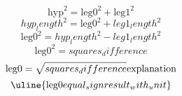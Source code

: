\[\text{{{hyp}}}^{{2}}=\text{{{leg0}}}^{{2}}+\text{{{leg1}}}^{{2}}\]
\[{hyp_length}^{{2}}=\text{{{leg0}}}^{{2}}+{leg1_length}^{{2}}\]
\[\text{{{leg0}}}^{{2}}={hyp_length}^{{2}}-{leg1_length}^{{2}}\]
\[\text{{{leg0}}}^{{2}}={squares_difference}\]
\[\text{{{leg0}}}=\sqrt{{\mathstrut {squares_difference}}}\text{{{explanation}}}\]
\[\uline{{\text{{{leg0}}}{equal_sign}{result_with_unit}}}\]
